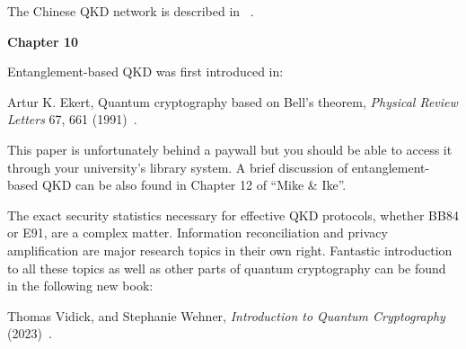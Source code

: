 The Chinese QKD network is described in ~\cite{chen2021integrated}.

{\bf Chapter 10}

Entanglement-based QKD was first introduced in:

Artur K. Ekert, Quantum cryptography based on Bell’s theorem, \emph{Physical Review Letters} 67, 661 (1991)~\cite{ekert1991qcb}.

This paper is unfortunately behind a paywall but you should be able to access it through your university’s library system.
A brief discussion of entanglement-based QKD can be also found in Chapter 12 of “Mike \& Ike”.

The exact security statistics necessary for effective QKD protocols, whether BB84 or E91, are a complex matter.  Information reconciliation and privacy amplification are major research topics in their own right.
Fantastic introduction to all these topics as well as other parts of quantum cryptography can be found in the following new book:

Thomas Vidick, and Stephanie Wehner, \emph{Introduction to Quantum Cryptography} (2023)~\cite{vidick_wehner_2023}.